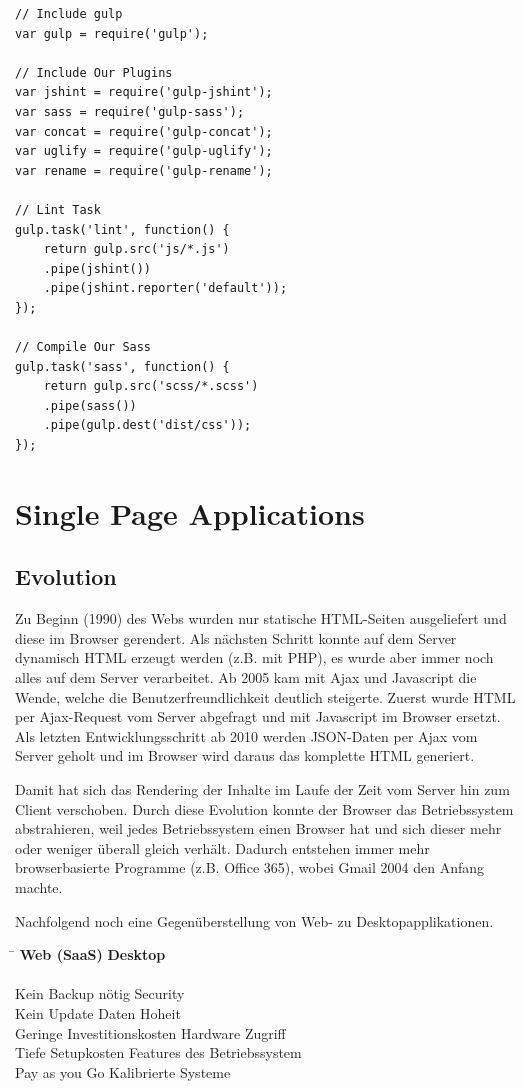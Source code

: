 \begin{lstlisting}[label=lst:sample-gulp,caption=sample gulp]
// Include gulp
var gulp = require('gulp');

// Include Our Plugins
var jshint = require('gulp-jshint');
var sass = require('gulp-sass');
var concat = require('gulp-concat');
var uglify = require('gulp-uglify');
var rename = require('gulp-rename');

// Lint Task
gulp.task('lint', function() {
	return gulp.src('js/*.js')
	.pipe(jshint())
	.pipe(jshint.reporter('default'));
});

// Compile Our Sass
gulp.task('sass', function() {
	return gulp.src('scss/*.scss')
	.pipe(sass())
	.pipe(gulp.dest('dist/css'));
});
\end{lstlisting}

\section{Single Page Applications}

\subsection{Evolution}

Zu Beginn (1990) des Webs wurden nur statische HTML-Seiten ausgeliefert und diese im Browser gerendert. Als nächsten Schritt konnte auf dem Server dynamisch HTML erzeugt werden (z.B. mit PHP), es wurde aber immer noch alles auf dem Server verarbeitet. Ab 2005 kam mit Ajax und Javascript die Wende, welche die Benutzerfreundlichkeit deutlich steigerte. Zuerst wurde HTML per Ajax-Request vom Server abgefragt und mit Javascript im Browser ersetzt. Als letzten Entwicklungsschritt ab 2010 werden JSON-Daten per Ajax vom Server geholt und im Browser wird daraus das komplette HTML generiert. 

Damit hat sich das Rendering der Inhalte im Laufe der Zeit vom Server hin zum Client verschoben. Durch diese Evolution konnte der Browser das Betriebssystem abstrahieren, weil jedes Betriebssystem einen Browser hat und sich dieser mehr oder weniger überall gleich verhält. Dadurch entstehen immer mehr browserbasierte Programme (z.B. Office 365), wobei Gmail 2004 den Anfang machte.

Nachfolgend noch eine Gegenüberstellung von Web- zu Desktopapplikationen.

\begin{tabbing}
	\hspace{6cm}\=\kill
	\textbf{Web (SaaS)} \> \textbf{Desktop} \\
	\> \\
	Kein Backup nötig \> Security \\
	Kein Update \> Daten Hoheit \\
	Geringe Investitionskosten \> Hardware Zugriff \\
	Tiefe Setupkosten \> Features des Betriebssystem \\
	Pay as you Go \> Kalibrierte Systeme \\
\end{tabbing} 

